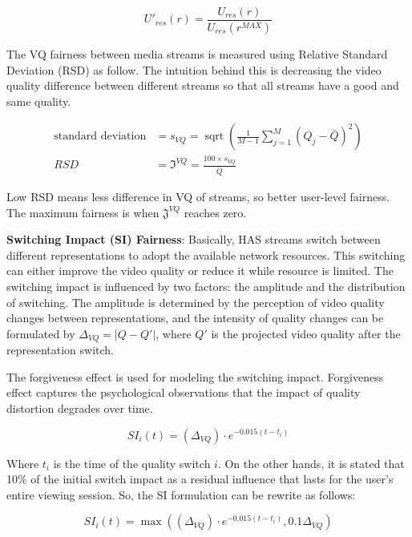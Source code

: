 \documentclass{article}
\begin{document}
\begin{equation}
U\prime_{r e s}(r)=\frac{U_{r e s}(r)}{U_{r e s}\left(r^{M A X}\right)}
\end{equation}

The VQ fairness between media streams is measured using Relative Standard Deviation (RSD) as follow. The intuition behind this is decreasing the video quality difference between different streams so that all streams have a good and same quality.

\begin{equation}
\begin{aligned}
\text{standard deviation} &=s_{V Q}=\operatorname{sqrt}\left(\frac{1}{M-1} \sum_{j=1}^{M}\left(Q_{j}-\bar{Q}\right)^{2}\right) \\
R S D &=\mathfrak{I}^{V Q}=\frac{100 \times s_{V Q}}{\bar{Q}}
\end{aligned}
\end{equation}

Low RSD means less difference in VQ of streams, so better user-level fairness. The maximum fairness is when $\mathfrak{J}^{V Q}$ reaches zero.

\textbf{Switching Impact (SI) Fairness}: Basically, HAS streams switch between different representations to adopt the available network resources. This switching can either improve the video quality or reduce it while resource is limited. The switching impact is influenced by two factors: the amplitude and the distribution of switching. The amplitude is determined by the perception of video quality changes between representations, and the intensity of quality changes can be formulated by $\Delta_{V Q}=|Q-Q\prime|$, where $Q\prime$ is the projected video quality after the representation switch.

The forgiveness effect is used for modeling the switching impact. Forgiveness effect captures the psychological observations that the impact of quality distortion degrades over time.

\begin{equation}
S I_{i}(t)=\left(\Delta_{V Q}\right) \cdot e^{-0.015\left(t-t_{i}\right)}
\end{equation}

Where $t_i$ is the time of the quality switch $i$. 
On the other hands, it is stated that 10\% of the initial switch impact as a residual influence that lasts for the user’s entire viewing session. So, the SI formulation can be rewrite as follows:

\begin{equation}
S I_{i}(t)=\max \left(\left(\Delta_{V Q}\right) \cdot e^{-0.015\left(t-t_{i}\right)}, 0.1 \Delta_{V Q}\right)
\end{equation}
\end{document}
